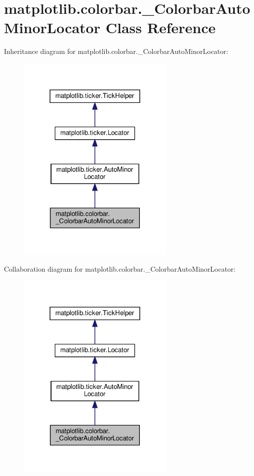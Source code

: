 \hypertarget{classmatplotlib_1_1colorbar_1_1__ColorbarAutoMinorLocator}{}\section{matplotlib.\+colorbar.\+\_\+\+Colorbar\+Auto\+Minor\+Locator Class Reference}
\label{classmatplotlib_1_1colorbar_1_1__ColorbarAutoMinorLocator}


Inheritance diagram for matplotlib.\+colorbar.\+\_\+\+Colorbar\+Auto\+Minor\+Locator\+:
\nopagebreak
\begin{figure}[H]
\begin{center}
\leavevmode
\includegraphics[width=216pt]{classmatplotlib_1_1colorbar_1_1__ColorbarAutoMinorLocator__inherit__graph}
\end{center}
\end{figure}


Collaboration diagram for matplotlib.\+colorbar.\+\_\+\+Colorbar\+Auto\+Minor\+Locator\+:
\nopagebreak
\begin{figure}[H]
\begin{center}
\leavevmode
\includegraphics[width=216pt]{classmatplotlib_1_1colorbar_1_1__ColorbarAutoMinorLocator__coll__graph}
\end{center}
\end{figure}
